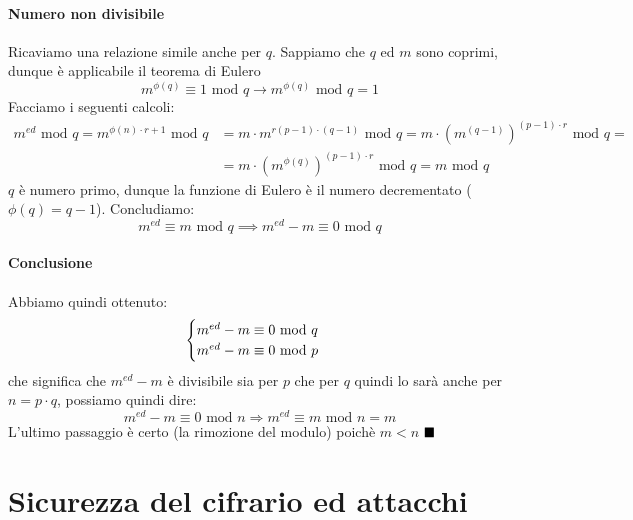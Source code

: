 \paragraph{Numero non divisibile} Ricaviamo una relazione simile anche per $q$. Sappiamo che $q$ ed $m$ sono coprimi, dunque è applicabile il teorema di Eulero
$$m^{\phi(q)} \equiv 1 \text{ mod }q \longrightarrow m^{\phi(q)} \text{ mod } q = 1$$
Facciamo i seguenti calcoli:
\begin{align*}
	m^{ed} \text{ mod } q = m^{\phi(n) \cdot r + 1} \text{ mod } q &= m \cdot m^{r(p-1)\cdot(q-1)} \text{ mod }q=m \cdot (m^{(q-1)})^{(p-1)\cdot{r}} \text{ mod } q=\\&=m \cdot (m^{\phi(q)})^{(p-1)\cdot{r}} \text{ mod } q=m \text{ mod } q\end{align*}
$q$ è numero primo, dunque la funzione di Eulero è il numero decrementato ($\phi(q)=q-1$).  Concludiamo:
$$ m^{ed} \equiv m \text{ mod } q \implies m^{ed} - m \equiv 0 \text{ mod } q $$
\paragraph{Conclusione} Abbiamo quindi ottenuto:
\[
    \begin{cases}
    $$ m^{ed} - m \equiv 0 \text{ mod } q $$ \\ 
    $$ m^{ed} - m \equiv 0 \text{ mod } p $$
    \end{cases}
\]
che significa che $ m^{ed} -m $ è divisibile sia per $p$ che per $q$ quindi lo sarà anche per $n = p \cdot q$, possiamo quindi dire:
$$ m^{ed} -m \equiv 0 \text{ mod } n \Longrightarrow m^{ed} \equiv m \text{ mod } n = m $$
L'ultimo passaggio è certo (la rimozione del modulo) poichè $m <n$
$\hfill\blacksquare$

\section{Sicurezza del cifrario ed attacchi}
